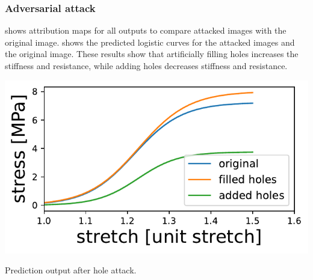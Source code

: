 \subsubsection{Adversarial attack}
 shows attribution maps for all outputs to compare attacked images with the original image.
 shows the predicted logistic curves for the attacked images and the original image.
These results show that artificially filling holes increases the stiffness and resistance, while adding holes decreases stiffness and resistance.
\begin{marginfigure}
    \centering
    \includegraphics{skinstression/images/attack/holes.pdf}
    \caption[Prediction output after hole attack]{
        Prediction output after hole attack.
    }
    \label{fig:pred_output_attack}
\end{marginfigure}


